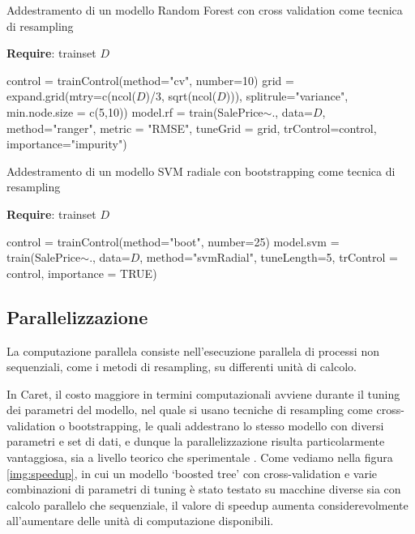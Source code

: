 \documentclass[12pt]{article}
\begin{document}
\begin{algorithm}[H]
    \caption{Addestramento di un modello Random Forest con cross validation come tecnica di resampling}\label{alg:train_rf}
    \textbf{Require}: trainset $D$
    \begin{algorithmic}[1]
    \State control = trainControl(method="cv", number=10)
    \State grid = expand.grid(mtry=c(ncol($D$)/3, sqrt(ncol($D$))), splitrule="variance", min.node.size = c(5,10))
    \State model.rf = train(SalePrice$\sim$., data=$D$, method="ranger", metric = "RMSE", tuneGrid = grid, trControl=control, importance="impurity")
    \end{algorithmic}
\end{algorithm}

\begin{algorithm}[H]
    \caption{Addestramento di un modello SVM radiale con bootstrapping come tecnica di resampling}\label{alg:train_svm}
    \textbf{Require}: trainset $D$
    \begin{algorithmic}[1]
    \State control = trainControl(method="boot", number=25)
    \State model.svm = train(SalePrice$\sim$., data=$D$, method="svmRadial", tuneLength=5, trControl = control, importance = TRUE)
    \end{algorithmic}
\end{algorithm}

\subsection{Parallelizzazione}
La computazione parallela consiste nell'esecuzione parallela di processi non sequenziali, come i metodi di resampling, su differenti unità di calcolo. 

In Caret, il costo maggiore in termini computazionali avviene durante il tuning dei parametri del modello, nel quale si usano tecniche di resampling come cross-validation o bootstrapping, le quali addestrano 
lo stesso modello con diversi parametri e set di dati, e dunque la parallelizzazione risulta particolarmente vantaggiosa, sia a livello teorico che sperimentale \cite{cit:parallel}. 
Come vediamo nella figura \ref{img:speedup}, in cui un modello ‘boosted tree’ con cross-validation e varie combinazioni di parametri di tuning è stato testato su macchine diverse sia con calcolo parallelo che sequenziale, il valore di speedup aumenta considerevolmente all'aumentare delle unità di computazione disponibili.
\end{document}
